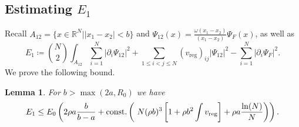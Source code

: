 \documentclass[a4paper,11pt]{article}
\newcommand{\abs}[1]{\left\lvert #1 \right\rvert}
\newcommand{\R}{\mathbb{R}}
\newtheorem{lemma}[theorem]{Lemma}
\numberwithin{equation}{section}
\begin{document}
	\subsection{Estimating $ E_1 $}
	\label{secE1}
	Recall $A_{12}=\{x\in\R^N\vert \abs{x_1-x_2}<b\}$ and $\Psi_{12}(x)=\frac{\omega(x_1-x_2)}{(x_1-x_2)}\Psi_F(x)$, as well as \begin{equation}
		E_1\coloneqq\binom{N}{2}\int_{A_{12}} \sum_{i=1}^{N}\abs{\partial_i\Psi_{12}}^2+\sum_{1\leq i<j\leq N}(v_{\text{reg}})_{ij}\abs{\Psi_{12}}^2-\sum_{i=1}^{N}\abs{\partial_i\Psi_F}^2.
	\end{equation}
	We prove the following bound. \begin{lemma}\label{LemmaE1Bound}
		For $b>\max(2a,R_0)$ we have
		\begin{equation}
			E_1\leq E_0 \left(2\rho a\frac{b}{b-a}+ \textnormal{const.}\left(\ N(\rho b)^3\left[ 1+ \rho b^2\int v_{\textnormal{reg}}\right]+\rho a \frac{\ln(N)}{N}\right)\right).
		\end{equation}
	\end{lemma}
\end{document}

